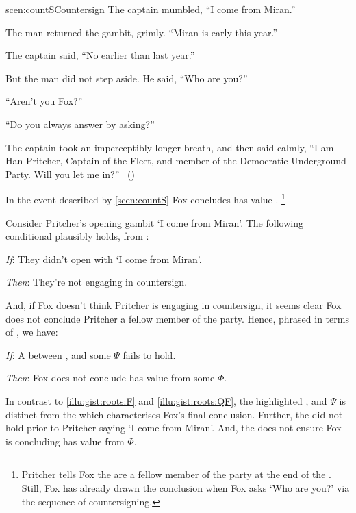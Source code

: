 \begin{note}
  \begin{rscenario}{scen:countS}{Countersign}%
    \indent The captain mumbled, ``I come from Miran.''

    The man returned the gambit, grimly.
    ``Miran is early this year.''

    The captain said, ``No earlier than last year.''

    But the man did not step aside.
    He said, ``Who are you?''

    ``Aren't you Fox?''

    ``Do you always answer by asking?''

    The captain took an imperceptibly longer breath, and then said calmly,
    ``I am Han Pritcher, Captain of the Fleet, and member of the Democratic Underground Party.
    Will you let me in?''%
    \mbox{ }\hfill\mbox{(\cite[70]{Asimov:1945aa})}%
    \newline
  \end{rscenario}

  \noindent%
  In the event described by \autoref{scen:countS} Fox concludes  has value .%
  \footnote{
    Pritcher tells Fox the are a fellow member of the party at the end of the \scen{}.
    Still, Fox has already drawn the conclusion when Fox asks `Who are you?' via the sequence of countersigning.
  }

  Consider Pritcher's opening gambit `I come from Miran'.
  The following conditional plausibly holds, from :
  \begin{itenum}
  \item[\emph{If}:]
    They didn't open with `I come from Miran'.
  \item[\emph{Then}:]
    They're not engaging in countersign.
  \end{itenum}
  And, if Fox doesn't think Pritcher is engaging in countersign, it seems clear Fox does not conclude Pritcher a fellow member of the party.
  Hence, phrased in terms of , we have:
  \begin{itenum}
  \item[\emph{If}:]
    A \ros{} between ,  and some \pool{} \(\Psi\) fails to hold.
  \item[\emph{Then}:]
    Fox does not conclude  has value  from some \pool{} \(\Phi\).
  \end{itenum}
  In contrast to  \ref{illu:gist:roots:F} and \ref{illu:gist:roots:QF}, the highlighted \ros{} ,  and \(\Psi\) is distinct from the \ros{} which characterises Fox's final conclusion.
  Further, the \ros{} did not hold prior to Pritcher saying `I come from Miran'.
  And, the \ros{} does not ensure Fox is concluding  has value  from \(\Phi\).


\end{note}
